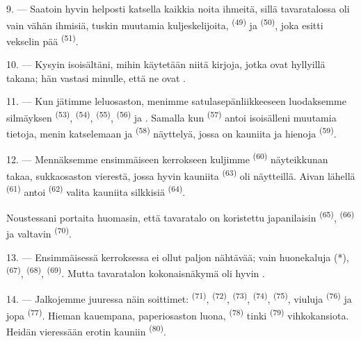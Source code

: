 9. --- Saatoin hyvin helposti katsella kaikkia noita ihmeitä, sillä tavaratalossa
oli vain vähän ihmisiä, tuskin muutamia kuljeskelijoita, 
\textsuperscript{(49)} ja  \textsuperscript{(50)}, joka
esitti vekselin pää \textsuperscript{(51)}.

10. --- Kysyin isoisältäni, mihin käytetään niitä kirjoja, jotka ovat hyllyillä
 takana; hän vastasi minulle, että ne ovat
.

\VUsaut{3.6mm}
\VUsaut{2.8mm}

11. --- Kun jätimme leluosaston, menimme satulasepänliikkeeseen luodaksemme
silmäyksen  \textsuperscript{(53)}, 
\textsuperscript{(54)},  \textsuperscript{(55)},
 \textsuperscript{(56)} ja .
Samalla kun  \textsuperscript{(57)} antoi isoisälleni
muutamia tietoja, menin katselemaan  ja 
\textsuperscript{(58)} näyttelyä, jossa on kauniita  ja
hienoja  \textsuperscript{(59)}.

12. --- Mennäksemme ensimmäiseen kerrokseen kuljimme 
\textsuperscript{(60)} näyteikkunan takaa, sukkaosaston vierestä, jossa hyvin
kauniita  \textsuperscript{(63)} oli näytteillä. Aivan
lähellä  \textsuperscript{(61)} antoi 
\textsuperscript{(62)} valita kauniita silkkisiä 
\textsuperscript{(64)}.

Noustessani portaita huomasin, että tavaratalo on koristettu japanilaisin
 \textsuperscript{(65)}, 
\textsuperscript{(66)} ja valtavin  \textsuperscript{(70)}.

13. --- Ensimmäisessä kerroksessa ei ollut paljon nähtävää; vain huonekaluja (*),
 \textsuperscript{(67)}, 
\textsuperscript{(68)},  \textsuperscript{(69)}. Mutta
tavaratalon kokonaisnäkymä oli hyvin .

14. --- Jalkojemme juuressa näin soittimet: 
\textsuperscript{(71)},  \textsuperscript{(72)},
 \textsuperscript{(73)}, 
\textsuperscript{(74)},  \textsuperscript{(75)}, viuluja
 \textsuperscript{(76)} ja jopa 
\textsuperscript{(77)}. Hieman kauempana, paperiosaston luona,
 \textsuperscript{(78)} tinki 
\textsuperscript{(79)} vihkokansiota. Heidän vieressään erotin kauniin
 \textsuperscript{(80)}.


